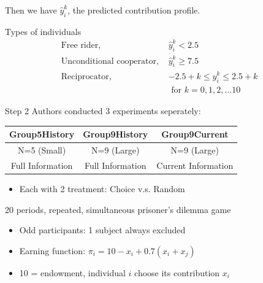 \documentclass[
  10pt,
  ignorenonframetext,
  aspectratio=43,
]{beamer}
\providecommand{\tightlist}{%
  \setlength{\itemsep}{0pt}\setlength{\parskip}{0pt}}
\begin{document}
\begin{frame}
Then we have \(\hat{y}^k_i\), the predicted contribution profile.

\begin{block}{Types of individuals}
\protect\hypertarget{types-of-individuals}{}
\[
\begin{array}{rl}
    \text{Free rider, } &\hat y_i^k < 2.5 \\
    \text{Unconditional cooperator, } &\hat y_i^k \geq 7.5 \\
    \text{Reciprocator, } &-2.5 + k \leq \hat y_i^k \leq 2.5+k \\
    &\text{ for } k = 0, 1, 2, \dots 10
\end{array}
\]
\end{block}
\end{frame}

\begin{frame}{Step 2}
\protect\hypertarget{step-2}{}
Authors conducted 3 experiments seperately:

\begin{longtable}[]{@{}ccc@{}}
\toprule
Group5History & Group9History & Group9Current \\
\midrule
\endhead
N=5 (Small) & N=9 (Large) & N=9 (Large) \\
Full Information & Full Information & Current Information \\
\bottomrule
\end{longtable}

\begin{itemize}
\tightlist
\item
  Each with 2 treatment: Choice v.s. Random
\end{itemize}

20 periods, repeated, simultaneous prisoner's dilemma game

\begin{itemize}
\tightlist
\item
  Odd participants: 1 subject always excluded
\item
  Earning function: \(\pi_i = 10 - x_i + 0.7(x_i + x_j)\)
\item
  10 = endowment, individual \(i\) choose its contribution \(x_i\)
\end{itemize}
\end{frame}
\end{document}
